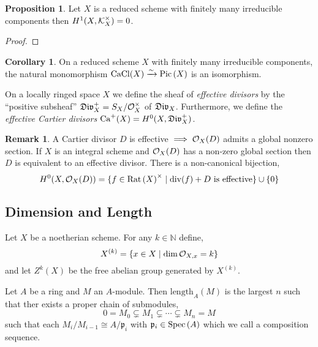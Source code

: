 \documentclass[12pt]{extarticle}
\newcommand{\N}{\mathbb{N}}
\theoremstyle{definition}
\newtheorem{proposition}[theorem]{Proposition}
\newtheorem{corollary}[theorem]{Corollary}
\newtheorem{remark}{Remark}
\newenvironment{definition}[1][Definition:]{\begin{trivlist}
\item[\hskip \labelsep {\bfseries #1}]}{\end{trivlist}}
\begin{document}
\begin{proposition}
Let $X$ is a reduced scheme with finitely many irreducible components then $H^1(X, \mathcal{K}_X^\times) = 0$. 
\end{proposition}

\begin{proof}

\end{proof}

\begin{corollary}
On a reduced scheme $X$ with finitely many irreducible components, the natural monomorphism $\mathrm{CaCl}(X) \xrightarrow{\sim} \mathrm{Pic}\left( X \right)$ is an isomorphism.
\end{corollary}

\begin{definition}
On a locally ringed space $X$ we define the sheaf of \textit{effective divisors} by the ``positive subsheaf'' $\mathfrak{Div}_X^+ = S_X / \mathcal{O}_{X}^\times$ of $\mathfrak{Div}_X$. Furthermore, we define the \textit{effective Cartier divisors} $\mathrm{Ca}^+(X) = H^0(X, \mathfrak{Div}_X^+)$.  
\end{definition}

\begin{remark}
A Cartier divisor $D$ is effective $\implies \mathcal{O}_{X}(D)$ admits a global nonzero section. If $X$ is an integral scheme and $\mathcal{O}_{X}(D)$ has a non-zero global section then $D$ is equivalent to an effective divisor. There is a non-canonical bijection,
\[ H^0(X, \mathcal{O}_{X}(D)) = \{ f \in \mathrm{Rat} \left( X \right)^\times \mid \mathrm{div}(f) + D \text{ is effective} \} \cup \{ 0 \} \]
\end{remark}

\subsection{Dimension and Length}

\begin{definition}
Let $X$ be a noetherian scheme. For any $k \in \N$ define,
\[ X^{(k)} = \{ x \in X \mid \dim{\mathcal{O}_{X, x}} = k \} \]
and let $Z^k(X)$ be the free abelian group generated by $X^{(k)}$. 
\end{definition}

\newcommand{\length}[2]{\mathrm{length}_{#1}\left( #2 \right)}
\newcommand{\p}{\mathfrak{p}}

\begin{definition}
Let $A$ be a ring and $M$ an $A$-module. Then $\length{A}{M}$ is the largest $n$ such that ther exists a proper chain of submodules,
\[ 0 = M_0 \subsetneq M_1 \subsetneq  \cdots \subsetneq M_n = M \]
such that each $M_i / M_{i - 1} \cong A / \p_i$ with $\p_i \in \Spec{A}$ which we call a composition sequence.
\end{definition}
\end{document}
